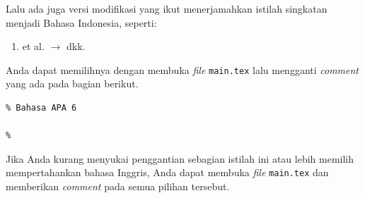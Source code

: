 Lalu ada juga versi modifikasi yang ikut menerjamahkan istilah singkatan menjadi Bahasa Indonesia, seperti:

\begin{enumerate}[nosep]
    \item et al. $\longrightarrow$ dkk.
\end{enumerate}

Anda dapat memilihnya dengan membuka \textit{file} \texttt{main.tex} lalu mengganti \textit{comment} yang ada pada bagian berikut.

\begin{lstlisting}
% Bahasa APA 6

%
\end{lstlisting}

Jika Anda kurang menyukai penggantian sebagian istilah ini atau lebih memilih mempertahankan bahasa Inggris, Anda dapat membuka \textit{file} \texttt{main.tex} dan memberikan \textit{comment} pada semua pilihan tersebut.